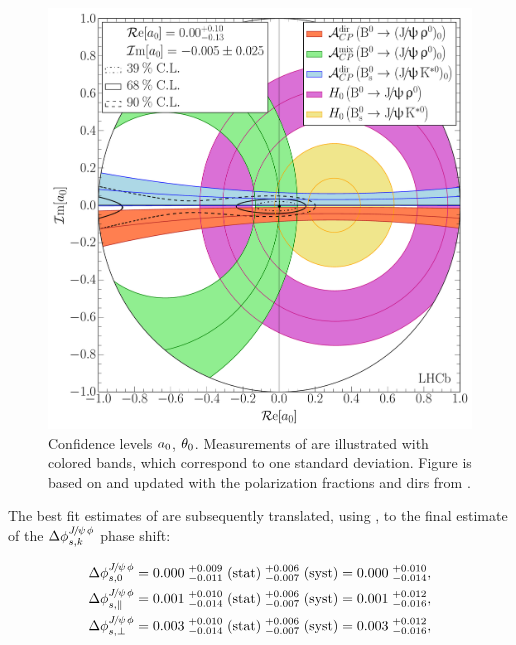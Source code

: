 \begin{figure}[!t]
  \centering
  \includegraphics[trim=0.0cm 0.0cm 0.0cm 0.0cm, clip=true,scale=0.39]{Figures/Chapter5/Penguin_Contribution_Re_vs_Im_allB2VV_Long_withH.pdf}
  \caption{Confidence levels $a_{0}$, $\theta_{0}$. Measurements of  are illustrated with
           colored bands, which correspond to one standard deviation. Figure is based on \cite{DeBruyn-thesis}
           and updated with the \BsJpsiKst polarization fractions and \Acp{dir} from .}
  \label{pengPlot_long}
\end{figure}

The best fit estimates of  are subsequently translated, using ,
to the final estimate of the $\Delta\phi^{{J\mskip -3mu/\mskip -2mu\psi\mskip 2mu}\phi}_{s,{k}}$ phase shift:

\begin{subequations}
\label{delta_phis_result}
\begin{align}
\Delta\phi^{{J\mskip -3mu/\mskip -2mu\psi\mskip 2mu}\phi}_{s,{0}}         & = 0.000 \; ^{+0.009}_{-0.011} \; {\rm (stat)} \; ^{+0.006}_{-0.007} \; ({\rm syst}) = 0.000 \; ^{+0.010}_{-0.014},\\
\Delta\phi^{{J\mskip -3mu/\mskip -2mu\psi\mskip 2mu}\phi}_{s,{\parallel}} & = 0.001 \; ^{+0.010}_{-0.014} \; {\rm (stat)} \; ^{+0.006}_{-0.007} \; ({\rm syst)} = 0.001 \; ^{+0.012}_{-0.016},\\
\Delta\phi^{{J\mskip -3mu/\mskip -2mu\psi\mskip 2mu}\phi}_{s,{\perp}}     & = 0.003 \; ^{+0.010}_{-0.014} \; {\rm (stat)} \; ^{+0.006}_{-0.007} \; ({\rm syst)} = 0.003 \; ^{+0.012}_{-0.016},
\end{align}
\end{subequations}


